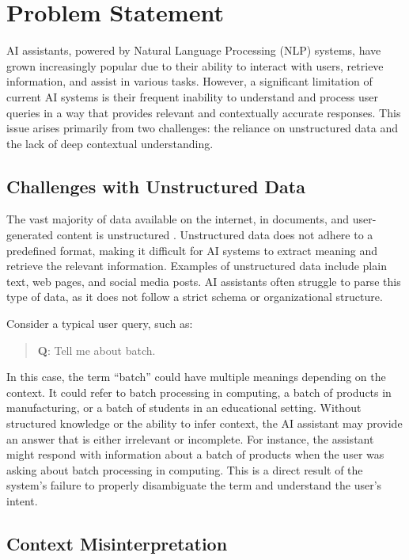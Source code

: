 \section{Problem Statement}

AI assistants, powered by Natural Language Processing (NLP) systems, have grown increasingly popular due to their ability to interact with users, retrieve information, and assist in various tasks. However, a significant limitation of current AI systems is their frequent inability to understand and process user queries in a way that provides relevant and contextually accurate responses. This issue arises primarily from two challenges: the reliance on unstructured data and the lack of deep contextual understanding.

\subsection{Challenges with Unstructured Data}

The vast majority of data available on the internet, in documents, and user-generated content is unstructured \citep{frank2020nlp}. Unstructured data does not adhere to a predefined format, making it difficult for AI systems to extract meaning and retrieve the relevant information. Examples of unstructured data include plain text, web pages, and social media posts. AI assistants often struggle to parse this type of data, as it does not follow a strict schema or organizational structure.

Consider a typical user query, such as:
\begin{quote}
    \textbf{Q}: Tell me about batch.
\end{quote}
In this case, the term “batch” could have multiple meanings depending on the context. It could refer to batch processing in computing, a batch of products in manufacturing, or a batch of students in an educational setting. Without structured knowledge or the ability to infer context, the AI assistant may provide an answer that is either irrelevant or incomplete. For instance, the assistant might respond with information about a batch of products when the user was asking about batch processing in computing. This is a direct result of the system's failure to properly disambiguate the term and understand the user's intent.

\subsection{Context Misinterpretation}

